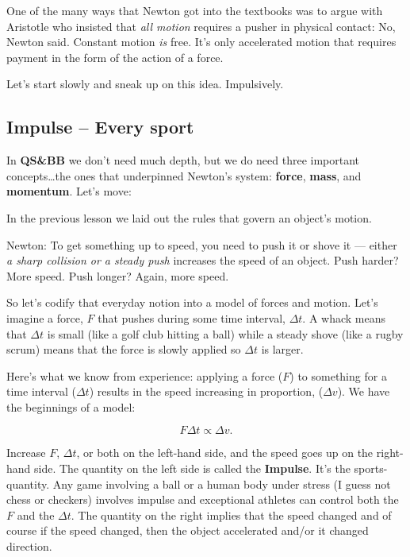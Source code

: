 \documentclass[
  letterpaper,
  DIV=11,
  numbers=noendperiod,
  oneside]{scrreprt}
\begin{document}
One of the many ways that Newton got into the textbooks was to argue
with Aristotle who insisted that \emph{all motion} requires a pusher in
physical contact: No, Newton said. Constant motion \emph{is} free. It's
only accelerated motion that requires payment in the form of the action
of a force.

Let's start slowly and sneak up on this idea. Impulsively.

\subsection{Impulse -- Every sport}\label{impulse-every-sport}

In \textbf{QS\&BB} we don't need much depth, but we do need three
important concepts\ldots the ones that underpinned Newton's system:
\textbf{force}, \textbf{mass}, and \textbf{momentum}. Let's move:

In the previous lesson we laid out the rules that govern an object's
motion.

Newton: To get something up to speed, you need to push it or shove it
--- either \emph{a sharp collision or a steady push} increases the speed
of an object. Push harder? More speed. Push longer? Again, more speed.

So let's codify that everyday notion into a model of forces and motion.
Let's imagine a force, \(F\) that pushes during some time interval,
\(\Delta t\). A whack means that \(\Delta t\) is small (like a golf club
hitting a ball) while a steady shove (like a rugby scrum) means that the
force is slowly applied so \(\Delta t\) is larger.

Here's what we know from experience: applying a force (\(F\)) to
something for a time interval (\(\Delta t\)) results in the speed
increasing in proportion, (\(\Delta v\)). We have the beginnings of a
model:

\[
\begin{equation}
F\Delta t \propto \Delta v. \label{impulse1}
\end{equation}
\]

Increase \(F\), \(\Delta t\), or both on the left-hand side, and the
speed goes up on the right-hand side. The quantity on the left side is
called the \textbf{Impulse}. It's the sports-quantity. Any game
involving a ball or a human body under stress (I guess not chess or
checkers) involves impulse and exceptional athletes can control both the
\(F\) and the \(\Delta t\). The quantity on the right implies that the
speed changed and of course if the speed changed, then the object
accelerated and/or it changed direction.
\end{document}
